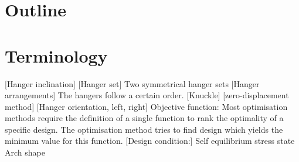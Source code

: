 \section{Outline} \label{sec:int_out}


\section{Terminology} \label{sec:int_term}
[Hanger inclination]
[Hanger set] Two symmetrical hanger sets
[Hanger arrangements] The hangers follow a certain order. 
[Knuckle]
[zero-displacement method]
[Hanger orientation, left, right]
Objective function: Most optimisation methods require the definition of a single function to rank the optimality of a specific design. The optimisation method tries to find design which yields the minimum value for this function.
[Design condition:]
Self equilibrium stress state
Arch shape
